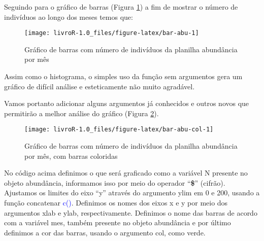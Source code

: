 \documentclass[14pt,titlepage, oneside, openany, a4paper]{book}
\newenvironment{Shaded}{\begin{snugshade}}{\end{snugshade}}
\newcommand{\DataTypeTok}[1]{\textcolor[rgb]{0.13,0.29,0.53}{#1}}
\newcommand{\DecValTok}[1]{\textcolor[rgb]{0.00,0.00,0.81}{#1}}
\newcommand{\KeywordTok}[1]{\textcolor[rgb]{0.13,0.29,0.53}{\textbf{#1}}}
\newcommand{\NormalTok}[1]{#1}
\newcommand{\OperatorTok}[1]{\textcolor[rgb]{0.81,0.36,0.00}{\textbf{#1}}}
\newcommand{\StringTok}[1]{\textcolor[rgb]{0.31,0.60,0.02}{#1}}
\begin{document}
Seguindo para o gráfico de barras (Figura \ref{fig:bar-abu}) a fim de mostrar o número de indivíduos ao longo dos meses temos que:

\begin{Shaded}
\end{Shaded}

\begin{figure}[H]
\texttt{[image: livroR-1.0\_files/figure-latex/bar-abu-1]} \caption{Gráfico de barras com número de indivíduos da planilha abundância por mês}\label{fig:bar-abu}
\end{figure}

Assim como o histograma, o simples uso da função sem argumentos gera um gráfico de difícil análise e esteticamente não muito agradável.

Vamos portanto adicionar alguns argumentos já conhecidos e outros novos que permitirão a melhor análise do gráfico (Figura \ref{fig:bar-abu-col}).

\begin{Shaded}
\end{Shaded}

\begin{figure}[H]
\texttt{[image: livroR-1.0\_files/figure-latex/bar-abu-col-1]} \caption{Gráfico de barras com número de indivíduos da planilha abundância por mês, com barras coloridas}\label{fig:bar-abu-col}
\end{figure}

No código acima definimos o que será graficado como a variável N presente no objeto abundância, informamos isso por meio do operador ``\textbf{\$}'' (cifrão). Ajustamos os limites do eixo ``y'' através do argumento ylim em 0 e 200, usando a função concatenar \textcolor{blue}{c()}. Definimos os nomes dos eixos x e y por meio dos argumentos xlab e ylab, respectivamente. Definimos o nome das barras de acordo com a variável mes, também presente no objeto abundância e por último definimos a cor das barras, usando o argumento col, como verde.
\end{document}
